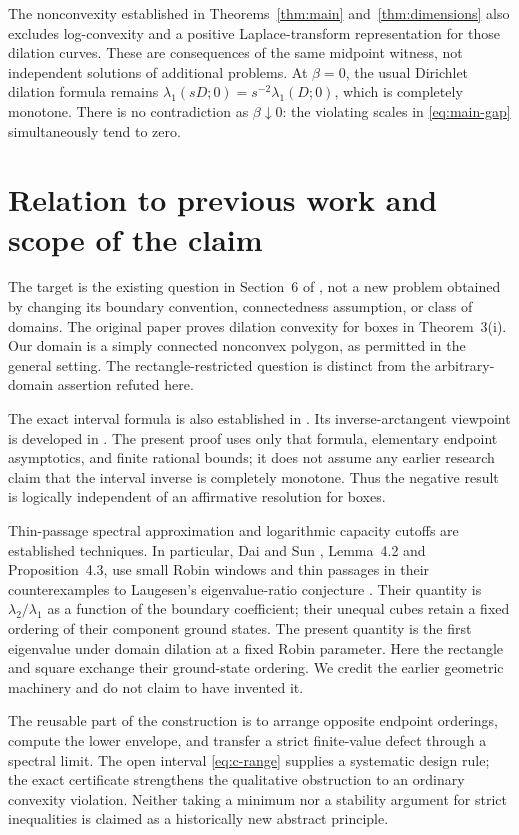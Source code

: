 \documentclass[11pt,a4paper]{article}
\theoremstyle{definition}\newtheorem{definition}[theorem]{Definition}
\theoremstyle{remark}\newtheorem{remark}[theorem]{Remark}
\begin{document}
The nonconvexity established in Theorems~\ref{thm:main}
and~\ref{thm:dimensions} also excludes log-convexity and a positive
Laplace-transform representation for those dilation curves.
These are consequences of the same midpoint witness,
not independent solutions of additional problems. At
$\beta=0$, the usual Dirichlet dilation formula remains
$\lambda_1(sD;0)=s^{-2}\lambda_1(D;0)$, which is completely
monotone. There is no contradiction as $\beta\downarrow0$:
the violating scales in \eqref{eq:main-gap} simultaneously tend
to zero.

\section{Relation to previous work and scope of the claim}
\label{sec:prior}

The target is the existing question in Section~6 of
\cite{KW2018}, not a new problem obtained by changing its
boundary convention, connectedness assumption, or class of
domains. The original paper proves dilation convexity for
boxes in Theorem~3(i). Our domain is a simply connected
nonconvex polygon, as permitted in the general setting.
The rectangle-restricted question is distinct from the
arbitrary-domain assertion refuted here.

The exact interval formula is also established in
\cite{KW2018}. Its inverse-arctangent viewpoint is developed
in \cite{KKW2018}. The present proof uses only that formula,
elementary endpoint asymptotics, and finite rational bounds;
it does not assume any earlier research claim that the interval
inverse is completely monotone. Thus the negative result is
logically independent of an affirmative resolution for boxes.

Thin-passage spectral approximation and logarithmic capacity
cutoffs are established techniques. In particular, Dai and Sun
\cite{DS2026}, Lemma~4.2 and Proposition~4.3, use small Robin
windows and thin passages in their counterexamples to
Laugesen's eigenvalue-ratio conjecture \cite{Laugesen2019}.
Their quantity is $\lambda_2/\lambda_1$ as a function of the
boundary coefficient; their unequal cubes retain a fixed
ordering of their component ground states. The present quantity
is the first eigenvalue under domain dilation at a fixed Robin
parameter. Here the rectangle and square exchange their
ground-state ordering. We credit the earlier geometric
machinery and do not claim to have invented it.

The reusable part of the construction is to arrange opposite
endpoint orderings, compute the lower envelope, and transfer a
strict finite-value defect through a spectral limit. The open
interval \eqref{eq:c-range} supplies a systematic design rule;
the exact certificate strengthens the qualitative obstruction
to an ordinary convexity violation. Neither taking a minimum
nor a stability argument for strict inequalities is claimed as
a historically new abstract principle.
\end{document}
